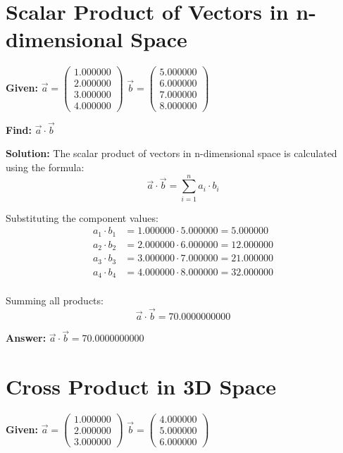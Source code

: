 \documentclass{article}
\begin{document}
\section*{Scalar Product of Vectors in n-dimensional Space}
\textbf{Given:}
$\vec{a} = \begin{pmatrix}1.000000 \\ 2.000000 \\ 3.000000 \\ 4.000000\end{pmatrix}$
$\vec{b} = \begin{pmatrix}5.000000 \\ 6.000000 \\ 7.000000 \\ 8.000000\end{pmatrix}$

\textbf{Find:} $\vec{a} \cdot \vec{b}$

\textbf{Solution:}
The scalar product of vectors in n-dimensional space is calculated using the formula:
\[
\vec{a} \cdot \vec{b} = \sum_{i=1}^{n} a_i \cdot b_i
\]

Substituting the component values:
\begin{align*}
a_{1} \cdot b_{1} &= 1.000000 \cdot 5.000000 = 5.000000 \\
a_{2} \cdot b_{2} &= 2.000000 \cdot 6.000000 = 12.000000 \\
a_{3} \cdot b_{3} &= 3.000000 \cdot 7.000000 = 21.000000 \\
a_{4} \cdot b_{4} &= 4.000000 \cdot 8.000000 = 32.000000 \\
\end{align*}

Summing all products:
\[
\vec{a} \cdot \vec{b} = 70.0000000000
\]

\textbf{Answer:} $\vec{a} \cdot \vec{b} = 70.0000000000$
\newpage

\section*{Cross Product in 3D Space}
\textbf{Given:}
$\vec{a} = \begin{pmatrix}1.000000 \\ 2.000000 \\ 3.000000\end{pmatrix}$
$\vec{b} = \begin{pmatrix}4.000000 \\ 5.000000 \\ 6.000000\end{pmatrix}$
\end{document}
